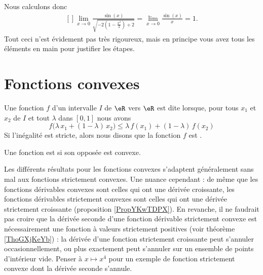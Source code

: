 Nous calculons donc
\begin{equation}
    \begin{aligned}[]
        \lim_{x\to 0} \frac{ \sin(x) }{ \sqrt{-2\left( 1-\frac{ x^2 }{ 2 } \right)+2} }=\lim_{x\to 0} \frac{ \sin(x) }{ x }=1.
    \end{aligned}
\end{equation}
Tout ceci n'est évidement pas très rigoureux, mais en principe vous avez tous les éléments en main pour justifier les étapes.

\section{Fonctions convexes}

\begin{definition}  \label{DefVQXRJQz}
    Une fonction $f$ d’un intervalle $I$ de \( \eR\) vers \( \eR\) est dite  lorsque, pour tous \( x_1\) et \( x_2\) de $I$ et tout $\lambda$ dans $[0, 1]$ nous avons
    \begin{equation}        \label{EQooYNAPooFePQZy}
        f\big(\lambda\, x_1+(1-\lambda)\, x_2\big) \leq \lambda\, f(x_1)+(1-\lambda)\, f(x_2)
    \end{equation}
    Si l'inégalité est stricte, alors nous disons que la fonction \( f\) est .

    Une fonction est  si son opposée est convexe.
\end{definition}


\begin{normaltext}
    Les différents résultats pour les fonctions convexes s'adaptent généralement sans mal aux fonctions strictement convexes. Une nuance cependant : de même que les fonctions dérivables convexes sont celles qui ont une dérivée croissante, les fonctions dérivables strictement convexes sont celles qui ont une dérivée strictement croissante (proposition \ref{PropYKwTDPX}). En revanche, il ne faudrait pas croire que la dérivée seconde d'une fonction dérivable strictement convexe est nécessairement une fonction à valeurs strictement positives (voir théorème \ref{ThoGXjKeYb}) : la dérivée d'une fonction strictement croissante peut s'annuler occasionnellement, ou plus exactement peut s'annuler sur un ensemble de points d'intérieur vide. Penser à \( x\mapsto x^4\) pour un exemple de fonction strictement convexe dont la dérivée seconde s'annule.
\end{normaltext}

